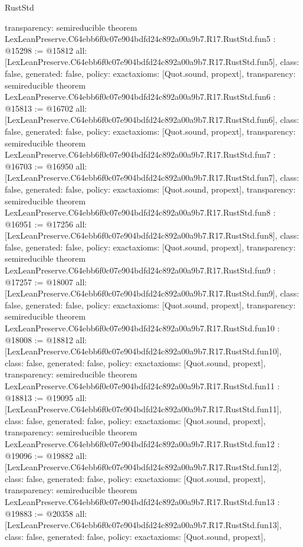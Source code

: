 \begin{lexlean}{RustStd}
\begin{coremodule}
{  transparency: semireducible
}
theorem LexLeanPreserve.C64ebb6f0c07e904bdfd24c892a00a9b7.R17.RustStd.fun5 : @15298 := @15812 {
  all: [LexLeanPreserve.C64ebb6f0c07e904bdfd24c892a00a9b7.R17.RustStd.fun5],
  class: false,
  generated: false,
  policy: exact{axioms: [Quot.sound, propext]},
  transparency: semireducible
}
theorem LexLeanPreserve.C64ebb6f0c07e904bdfd24c892a00a9b7.R17.RustStd.fun6 : @15813 := @16702 {
  all: [LexLeanPreserve.C64ebb6f0c07e904bdfd24c892a00a9b7.R17.RustStd.fun6],
  class: false,
  generated: false,
  policy: exact{axioms: [Quot.sound, propext]},
  transparency: semireducible
}
theorem LexLeanPreserve.C64ebb6f0c07e904bdfd24c892a00a9b7.R17.RustStd.fun7 : @16703 := @16950 {
  all: [LexLeanPreserve.C64ebb6f0c07e904bdfd24c892a00a9b7.R17.RustStd.fun7],
  class: false,
  generated: false,
  policy: exact{axioms: [Quot.sound, propext]},
  transparency: semireducible
}
theorem LexLeanPreserve.C64ebb6f0c07e904bdfd24c892a00a9b7.R17.RustStd.fun8 : @16951 := @17256 {
  all: [LexLeanPreserve.C64ebb6f0c07e904bdfd24c892a00a9b7.R17.RustStd.fun8],
  class: false,
  generated: false,
  policy: exact{axioms: [Quot.sound, propext]},
  transparency: semireducible
}
theorem LexLeanPreserve.C64ebb6f0c07e904bdfd24c892a00a9b7.R17.RustStd.fun9 : @17257 := @18007 {
  all: [LexLeanPreserve.C64ebb6f0c07e904bdfd24c892a00a9b7.R17.RustStd.fun9],
  class: false,
  generated: false,
  policy: exact{axioms: [Quot.sound, propext]},
  transparency: semireducible
}
theorem LexLeanPreserve.C64ebb6f0c07e904bdfd24c892a00a9b7.R17.RustStd.fun10 : @18008 := @18812 {
  all: [LexLeanPreserve.C64ebb6f0c07e904bdfd24c892a00a9b7.R17.RustStd.fun10],
  class: false,
  generated: false,
  policy: exact{axioms: [Quot.sound, propext]},
  transparency: semireducible
}
theorem LexLeanPreserve.C64ebb6f0c07e904bdfd24c892a00a9b7.R17.RustStd.fun11 : @18813 := @19095 {
  all: [LexLeanPreserve.C64ebb6f0c07e904bdfd24c892a00a9b7.R17.RustStd.fun11],
  class: false,
  generated: false,
  policy: exact{axioms: [Quot.sound, propext]},
  transparency: semireducible
}
theorem LexLeanPreserve.C64ebb6f0c07e904bdfd24c892a00a9b7.R17.RustStd.fun12 : @19096 := @19882 {
  all: [LexLeanPreserve.C64ebb6f0c07e904bdfd24c892a00a9b7.R17.RustStd.fun12],
  class: false,
  generated: false,
  policy: exact{axioms: [Quot.sound, propext]},
  transparency: semireducible
}
theorem LexLeanPreserve.C64ebb6f0c07e904bdfd24c892a00a9b7.R17.RustStd.fun13 : @19883 := @20358 {
  all: [LexLeanPreserve.C64ebb6f0c07e904bdfd24c892a00a9b7.R17.RustStd.fun13],
  class: false,
  generated: false,
  policy: exact{axioms: [Quot.sound, propext]},
}
\end{coremodule}
\end{lexlean}
